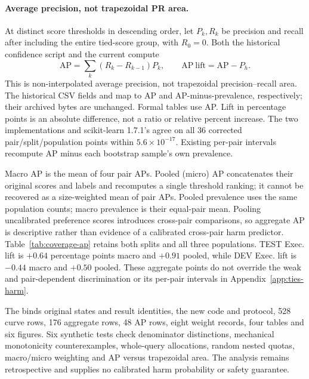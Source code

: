 \documentclass[11pt,a4paper]{article}
\begin{document}
\paragraph{Average precision, not trapezoidal PR area.}
At distinct score thresholds in descending order, let $P_k,R_k$ be precision and recall after including the entire tied-score group, with $R_0=0$. Both the historical confidence script and the current  compute
\begin{equation}
\mathrm{AP}=\sum_k (R_k-R_{k-1})P_k,\qquad
\mathrm{AP\ lift}=\mathrm{AP}-P_h.
\label{eq:coverage-ap}
\end{equation}
This is non-interpolated average precision, not trapezoidal precision--recall area. The historical CSV fields  and  map to AP and AP-minus-prevalence, respectively; their archived bytes are unchanged. Formal tables use AP. Lift in percentage points is an absolute difference, not a ratio or relative percent increase. The two implementations and scikit-learn 1.7.1's  agree on all 36 corrected pair/split/population points within $5.6\times10^{-17}$. Existing per-pair intervals recompute AP minus each bootstrap sample's own prevalence.

Macro AP is the mean of four pair APs. Pooled (micro) AP concatenates their original scores and labels and recomputes a single threshold ranking; it cannot be recovered as a size-weighted mean of pair APs. Pooled prevalence uses the same population counts; macro prevalence is their equal-pair mean. Pooling uncalibrated preference scores introduces cross-pair comparisons, so aggregate AP is descriptive rather than evidence of a calibrated cross-pair harm predictor. Table~\ref{tab:coverage-ap} retains both splits and all three populations. TEST Exec. lift is $+0.64$ percentage points macro and $+0.91$ pooled, while DEV Exec. lift is $-0.44$ macro and $+0.50$ pooled. These aggregate points do not override the weak and pair-dependent discrimination or its per-pair intervals in Appendix~\ref{app:ties-harm}.


The  binds original states and result identities, the new code and protocol, 528 curve rows, 176 aggregate rows, 48 AP rows, eight weight records, four tables and six figures. Six synthetic tests check denominator distinctions, mechanical monotonicity counterexamples, whole-query allocations, random nested quotas, macro/micro weighting and AP versus trapezoidal area. The analysis remains retrospective and supplies no calibrated harm probability or safety guarantee.
\FloatBarrier
\end{document}
